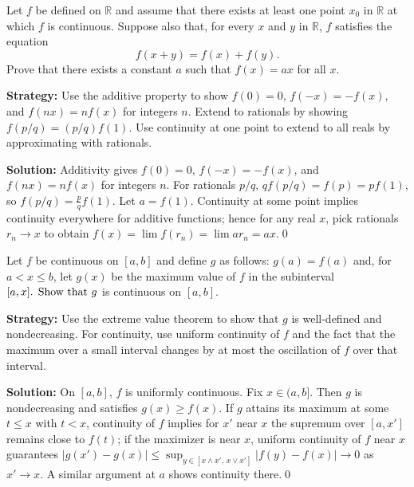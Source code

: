 \begin{problembox}
\begin{problemstatement}
Let \( f \) be defined on \( \mathbb{R} \) and assume that there exists at least one point \( x_0 \) in \( \mathbb{R} \) at which \( f \) is continuous. Suppose also that, for every \( x \) and \( y \) in \( \mathbb{R} \), \( f \) satisfies the equation
\[f(x + y) = f(x) + f(y).\]
Prove that there exists a constant \( a \) such that \( f(x) = ax \) for all \( x \).
\end{problemstatement}
\end{problembox}

\noindent\textbf{Strategy:} Use the additive property to show $f(0) = 0$, $f(-x) = -f(x)$, and $f(nx) = nf(x)$ for integers $n$. Extend to rationals by showing $f(p/q) = (p/q)f(1)$. Use continuity at one point to extend to all reals by approximating with rationals.

\bigskip\noindent\textbf{Solution:}
Additivity gives $f(0)=0$, $f(-x)=-f(x)$, and $f(nx)=nf(x)$ for integers $n$. For rationals $p/q$, $qf(p/q)=f(p)=pf(1)$, so $f(p/q)=\tfrac{p}{q}f(1)$. Let $a=f(1)$. Continuity at some point implies continuity everywhere for additive functions; hence for any real $x$, pick rationals $r_n\to x$ to obtain $f(x)=\lim f(r_n)=\lim ar_n=ax$.\qed



\begin{problembox}
\begin{problemstatement}
Let \( f \) be continuous on \([a, b]\) and define \( g \) as follows: \( g(a) = f(a) \) and, for \( a < x \leq b \), let \( g(x) \) be the maximum value of \( f \) in the subinterval \([a, x]$. Show that \( g \) is continuous on \([a, b]\).
\end{problemstatement}
\end{problembox}

\noindent\textbf{Strategy:} Use the extreme value theorem to show that $g$ is well-defined and nondecreasing. For continuity, use uniform continuity of $f$ and the fact that the maximum over a small interval changes by at most the oscillation of $f$ over that interval.

\bigskip\noindent\textbf{Solution:}
On $[a,b]$, $f$ is uniformly continuous. Fix $x\in(a,b]$. Then $g$ is nondecreasing and satisfies $g(x)\ge f(x)$. If $g$ attains its maximum at some $t\le x$ with $t<x$, continuity of $f$ implies for $x'$ near $x$ the supremum over $[a,x']$ remains close to $f(t)$; if the maximizer is near $x$, uniform continuity of $f$ near $x$ guarantees $|g(x')-g(x)|\le \sup_{y\in[x\wedge x',\,x\vee x']}|f(y)-f(x)|\to 0$ as $x'\to x$. A similar argument at $a$ shows continuity there.\qed



